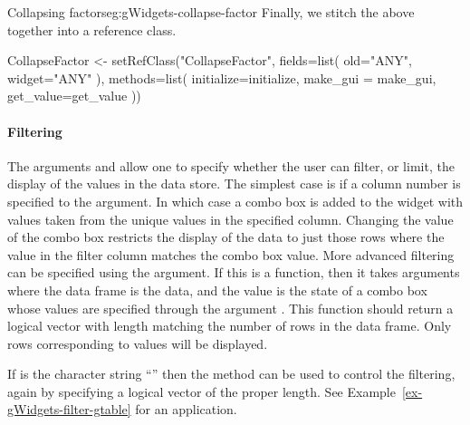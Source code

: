 \begin{example}{Collapsing factors}{eg:gWidgets-collapse-factor}
Finally, we stitch the above together into a reference class.
\begin{Schunk}
\begin{Sinput}
 CollapseFactor <- setRefClass("CollapseFactor",
                               fields=list(
                                old="ANY",
                                widget="ANY"
                                ),
                              methods=list(
                                initialize=initialize,
                                make_gui = make_gui,
                                get_value=get_value
                              ))
\end{Sinput}
\end{Schunk}


  
\end{example}


\paragraph{Filtering}
The arguments  and
 allow one to specify whether the user
can filter, or limit, the display of the values in the data store. The
simplest case is if a column number is specified to the
 argument. In which case a combo box is added to
the widget with values taken from the unique values in the specified
column. Changing the value of the combo box restricts the display of
the data to just those rows where the value in the filter column
matches the combo box value. More advanced filtering can be specified
using the  argument. If this is a
function, then it takes arguments 
where the data frame is the data, and the  value is
the state of a combo box whose values are specified through the
argument . This function should return
a logical vector with length matching the number of rows in the data
frame.  Only rows corresponding to  values will be
displayed. 


If  is the character string ``'' then
the  method can be used to control the
filtering, again by specifying a logical vector of the proper
length. See Example~\ref{ex-gWidgets-filter-gtable} for an
application.



